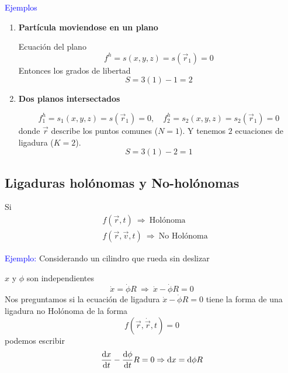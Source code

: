 \documentclass[../main]{subfiles}
\begin{document}
\textcolor{blue}{Ejemplos}
\begin{enumerate}
    \item \textbf{Partícula moviendose en un plano}
    
    Ecuación del plano
    \begin{equation*}
        f^h=s(x,y,z)=s(\vec{r}_1)=0
    \end{equation*}
    Entonces los grados de libertad 
    \begin{equation*}
        S=3(1)-1=2
    \end{equation*}
    \item \textbf{Dos planos intersectados}
    
    \begin{equation*}
        f^h_1=s_1(x,y,z)=s(\vec{r}_1)=0,\quad f^h_2=s_2(x,y,z)=s_2(\vec{r}_1)=0
    \end{equation*}
    donde $\vec{r}$ describe los puntos comunes ($N=1$). Y tenemos $2$ ecuaciones de ligadura ($K=2$).
    \begin{equation*}
        S=3(1)-2=1
    \end{equation*}
\end{enumerate}

\subsection{Ligaduras holónomas y No-holónomas}

Si 
\begin{align*}
    &f(\vec{r}, t) \ \Rightarrow \ \text{Holónoma}\\
    &f(\vec{r}, \vec{v}, t) \ \Rightarrow \ \text{No Holónoma}
\end{align*}

\textcolor{blue}{Ejemplo:} Considerando un cilindro que rueda sin deslizar

$x$ y $\phi$ son independientes
\begin{equation*}
    \dot{x}=\dot{\phi}R \ \Rightarrow \ \dot{x}-\dot{\phi}R=0
\end{equation*}
Nos preguntamos si la ecuación de ligadura $\dot{x}-\dot{\phi}R=0$ tiene la forma de una ligadura no Holónoma de la forma
\begin{equation*}
    f(\vec{r},\dot{\vec{r}}, t)=0
\end{equation*}
podemos escribir
\begin{equation*}
    \dv{x}{t}-\dv{\phi}{t}R=0 \Rightarrow \mathrm{d}x=\mathrm{d}\phi R
\end{equation*}
\end{document}
